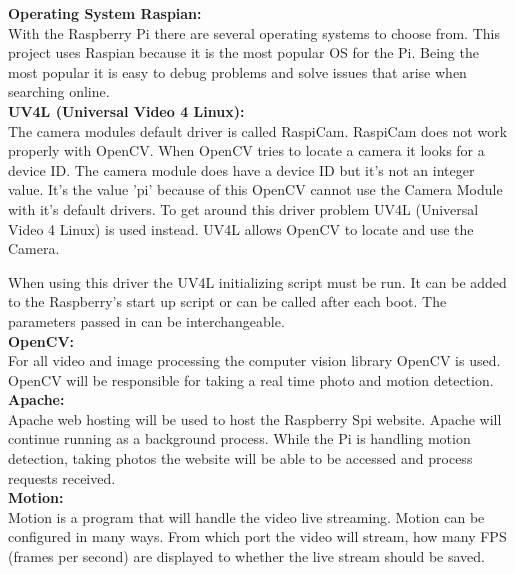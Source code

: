 \documentclass[]{report}
\begin{document}
{\bf Operating System Raspian:}\\

With the Raspberry Pi there are several operating systems to choose from. This project uses Raspian because it is the most popular OS for the Pi. Being the most popular it is easy to debug problems and solve issues that arise when searching online.\\ 


{\bf UV4L (Universal Video 4 Linux):}\\

The camera modules default driver is called RaspiCam. RaspiCam does not work properly with OpenCV. When OpenCV tries to locate a camera it looks for a device ID. The camera module does have a device ID but it's not an integer value. It's the value 'pi' because of this OpenCV cannot use the Camera Module with it's default drivers. To get around this driver problem UV4L (Universal Video 4 Linux) is used instead. UV4L allows OpenCV to locate and use the Camera.

When using this driver the UV4L initializing script must be run. It can be added to the Raspberry's start up script or can be called after each boot. The parameters passed in can be interchangeable.\\

{\bf OpenCV:}\\

For all video and image processing the computer vision library OpenCV is used.\\

OpenCV will be responsible for taking a real time photo and motion detection.\\

{\bf Apache:}\\

Apache web hosting will be used to host the Raspberry Spi website. Apache will continue running as a background process. While the Pi is handling motion detection, taking photos the website will be able to be accessed and process requests received.\\ 

{\bf Motion:}\\

Motion is a program that will handle the video live streaming. Motion can be configured in many ways. From which port the video will stream, how many FPS (frames per second) are displayed to whether the live stream should be saved.\\
\end{document}

